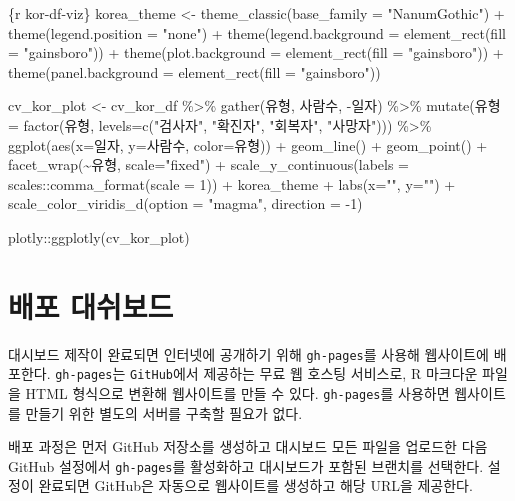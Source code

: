 \documentclass[
  letterpaper,
]{book}
\newenvironment{Shaded}{\begin{snugshade}}{\end{snugshade}}
\newcommand{\InformationTok}[1]{\textcolor[rgb]{0.37,0.37,0.37}{#1}}
\begin{document}
\begin{Shaded}
\begin{Highlighting}[]
\InformationTok{\textasciigrave{}\textasciigrave{}\textasciigrave{}\{r kor{-}df{-}viz\}}
\InformationTok{korea\_theme \textless{}{-} theme\_classic(base\_family = "NanumGothic") +}
\InformationTok{  theme(legend.position = "none") +}
\InformationTok{  theme(legend.background = element\_rect(fill = "gainsboro")) +}
\InformationTok{  theme(plot.background = element\_rect(fill = "gainsboro")) +}
\InformationTok{  theme(panel.background = element\_rect(fill = "gainsboro"))}

\InformationTok{cv\_kor\_plot \textless{}{-} cv\_kor\_df \%\textgreater{}\% }
\InformationTok{  gather(유형, 사람수, {-}일자) \%\textgreater{}\% }
\InformationTok{  mutate(유형 = factor(유형, levels=c("검사자", "확진자", "회복자", "사망자"))) \%\textgreater{}\% }
\InformationTok{  ggplot(aes(x=일자, y=사람수, color=유형)) +}
\InformationTok{    geom\_line() +  }
\InformationTok{    geom\_point() +}
\InformationTok{    facet\_wrap(\textasciitilde{}유형, scale="fixed") +}
\InformationTok{    scale\_y\_continuous(labels = scales::comma\_format(scale = 1)) +}
\InformationTok{    korea\_theme +}
\InformationTok{    labs(x="", y="") +}
\InformationTok{    scale\_color\_viridis\_d(option = "magma",}
\InformationTok{                     direction = {-}1) }

\InformationTok{plotly::ggplotly(cv\_kor\_plot)}
\InformationTok{\textasciigrave{}\textasciigrave{}\textasciigrave{}}
\end{Highlighting}
\end{Shaded}

\hypertarget{uxbc30uxd3ec-uxb300uxc26cuxbcf4uxb4dc}{%
\section{배포 대쉬보드}\label{uxbc30uxd3ec-uxb300uxc26cuxbcf4uxb4dc}}

대시보드 제작이 완료되면 인터넷에 공개하기 위해 \texttt{gh-pages}를
사용해 웹사이트에 배포한다. \texttt{gh-pages}는 \texttt{GitHub}에서
제공하는 무료 웹 호스팅 서비스로, R 마크다운 파일을 HTML 형식으로 변환해
웹사이트를 만들 수 있다. \texttt{gh-pages}를 사용하면 웹사이트를 만들기
위한 별도의 서버를 구축할 필요가 없다.

배포 과정은 먼저 GitHub 저장소를 생성하고 대시보드 모든 파일을 업로드한
다음 GitHub 설정에서 \texttt{gh-pages}를 활성화하고 대시보드가 포함된
브랜치를 선택한다. 설정이 완료되면 GitHub은 자동으로 웹사이트를 생성하고
해당 URL을 제공한다.
\end{document}

